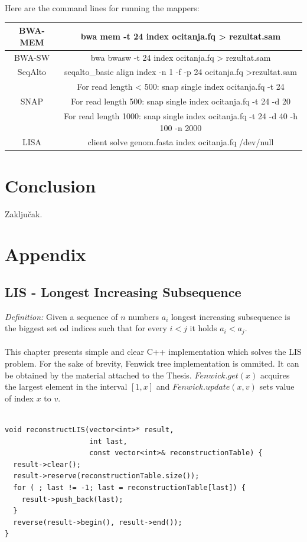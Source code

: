 \documentclass[times, utf8, diplomski]{fer}
\begin{document}
Here are the command lines for running the mappers:
\begin{table}[H]
\centering
\begin{tabular}{|c|c|}
\hline
BWA-MEM & bwa mem -t 24 index ocitanja.fq > rezultat.sam\\
\hline
BWA-SW & bwa bwasw -t 24 index ocitanja.fq > rezultat.sam\\
\hline
SeqAlto & seqalto\_basic align index -n 1 -f -p 24 ocitanja.fq >rezultat.sam\\
\hline
 & For read length < 500: snap single index ocitanja.fq -t 24\\
SNAP & For read length 500: snap single index ocitanja.fq -t 24 -d 20\\
& For read length 1000: snap single index ocitanja.fq -t 24 -d 40 -h 100 -n 2000\\
\hline
LISA & client solve genom.fasta index ocitanja.fq /dev/null\\
\hline
\end{tabular}
\label{komande}
\end{table}


\chapter{Conclusion}
Zaključak.

\chapter{Appendix}

\section{LIS - Longest Increasing Subsequence\cite{Fredman197529}}
\emph{Definition:} Given a sequence of $n$ numbers $a_i$ longest increasing subsequence is the biggest set od indices such that for every $i < j$ it holds $a_i < a_j$.\\
\\
This chapter presents simple and clear C++ implementation which solves the LIS problem. For the sake of brevity, Fenwick tree implementation is ommited. It can be obtained by the material attached to the Thesis. $Fenwick.get(x)$ acquires the largest element in the interval $[1,x]$ and $Fenwick.update(x, v)$ sets value of index $x$ to $v$.


\begin{algorithm}[H]
\begin{lstlisting}

void reconstructLIS(vector<int>* result,
                    int last,
                    const vector<int>& reconstructionTable) {
  result->clear();
  result->reserve(reconstructionTable.size());
  for ( ; last != -1; last = reconstructionTable[last]) {
    result->push_back(last);
  }
  reverse(result->begin(), result->end());
}

\end{lstlisting}
\end{algorithm}
\end{document}
